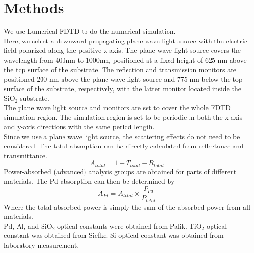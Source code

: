 \documentclass[journal]{IEEEtran}
\begin{document}
\section{Methods}
We use Lumerical FDTD to do the numerical simulation.\\
\indent
Here, we select a downward-propagating plane wave light source with the electric field polarized along the positive x-axis. The plane wave light source covers the wavelength from 400nm to 1000nm, positioned at a fixed height of 625 nm above the top surface of the substrate.  The reflection and transmission monitors are positioned 200 nm above the plane wave light source and 775 nm below the top surface of the substrate, respectively, with the latter monitor located inside the SiO$_2$ substrate.\\
\indent
The plane wave light source and monitors are set to cover the whole FDTD simulation region. The simulation region is set to be periodic in both the x-axis and y-axis directions with the same period length.\\
\indent
Since we use a plane wave light source, the scattering effects do not need to be considered. The total absorption can be directly calculated from reflectance and transmittance.\\
\begin{equation}
A_{total}=1-T_{total}-R_{total}
\label{eq:absorption}
\end{equation}
\indent
Power-absorbed (advanced) analysis groups are obtained for parts of different materials. The Pd absorption can then be determined by\\
\indent
\begin{equation}
A_{Pd} = A_{total} \times \frac{P_{Pd}}{P_{total}}
\label{eq:abspd}
\end{equation}
\indent
Where the total absorbed power is simply the sum of the absorbed power from all materials.\\
\indent
Pd, Al, and SiO$_2$ optical constants were obtained from Palik. TiO$_2$ optical constant was obtained from Siefke. Si optical constant was obtained from laboratory measurement.\\
\end{document}
